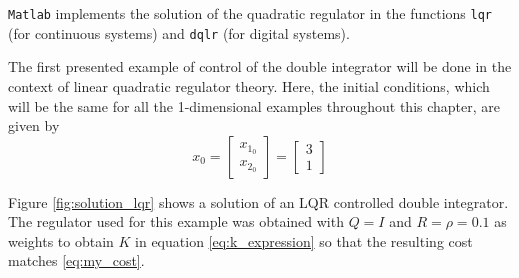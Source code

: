 

\par \texttt{Matlab} implements the solution of the quadratic regulator in the functions \texttt{lqr} (for continuous systems) and \texttt{dqlr} (for digital systems). %


\par The first presented example of control of the double integrator will be done in the context of linear quadratic regulator theory. Here, the initial conditions, which will be the same for all the 1-dimensional examples throughout this chapter, are  given by
\begin{equation}
    \label{eq:initial_conds}
    x_0 = \begin{bmatrix} x_{1_0} \\ x_{2_0} \end{bmatrix} = \begin{bmatrix} 3 \\ 1 \end{bmatrix}
\end{equation}

\par Figure \ref{fig:solution_lqr} shows a solution of an LQR controlled double integrator. The regulator used for this example was obtained with $Q = I$ and $R = \rho = 0.1$ as weights to obtain $K$ in equation \ref{eq:k_expression} so that the resulting cost matches \ref{eq:my_cost}.




